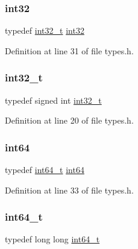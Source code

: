 \subsubsection{\texorpdfstring{int32}{int32}}
{\footnotesize\ttfamily typedef \hyperlink{a00038_ab1967d8591af1a4e48c37fd2b0f184d0_ab1967d8591af1a4e48c37fd2b0f184d0}{int32\+\_\+t} \hyperlink{a00038_ab7903878916593daecbeb95b98115ab0_ab7903878916593daecbeb95b98115ab0}{int32}}



Definition at line 31 of file types.\+h.

\mbox{\label{a00038_ab1967d8591af1a4e48c37fd2b0f184d0_ab1967d8591af1a4e48c37fd2b0f184d0}} 
\subsubsection{\texorpdfstring{int32\+\_\+t}{int32\_t}}
{\footnotesize\ttfamily typedef signed int \hyperlink{a00038_ab1967d8591af1a4e48c37fd2b0f184d0_ab1967d8591af1a4e48c37fd2b0f184d0}{int32\+\_\+t}}



Definition at line 20 of file types.\+h.

\mbox{\label{a00038_a7cde0074dfd288f2d70c0e035dacb28a_a7cde0074dfd288f2d70c0e035dacb28a}} 
\subsubsection{\texorpdfstring{int64}{int64}}
{\footnotesize\ttfamily typedef \hyperlink{a00038_a996e72f71b11a5bb8b3b7b6936b1516d_a996e72f71b11a5bb8b3b7b6936b1516d}{int64\+\_\+t} \hyperlink{a00038_a7cde0074dfd288f2d70c0e035dacb28a_a7cde0074dfd288f2d70c0e035dacb28a}{int64}}



Definition at line 33 of file types.\+h.

\mbox{\label{a00038_a996e72f71b11a5bb8b3b7b6936b1516d_a996e72f71b11a5bb8b3b7b6936b1516d}} 
\subsubsection{\texorpdfstring{int64\+\_\+t}{int64\_t}}
{\footnotesize\ttfamily typedef long long \hyperlink{a00038_a996e72f71b11a5bb8b3b7b6936b1516d_a996e72f71b11a5bb8b3b7b6936b1516d}{int64\+\_\+t}}



